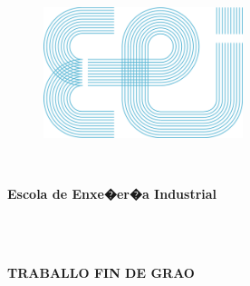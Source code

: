 \documentclass[11pt,twoside]{book}
\begin{document}
\stopcontents[parts]

\cleardoublepage
\renewcommand{\documento}{ANEXOS}

\begin{center}
\begin{figure}[htbp]
\begin{center}
\includegraphics[angle=0, height=3.8cm]{images/EEILogo.png}
\end{center}
\end{figure}
\ \\
\begin{large}
\begin{center}
\color{blue}\textbf{Escola de Enxe�er�a Industrial}
\end{center}
\end{large}
\ \\
\ \\
\begin{large}
\begin{center}
\textbf{TRABALLO FIN DE GRAO}
\end{center}
\end{large}
\ \\
\ \\
\begin{large}
\begin{center}
{\titulouno}
\end{center}
\end{large}
\ \\
\ \\
\begin{normalsize}

\end{normalsize}
\end{center}
\end{document}
